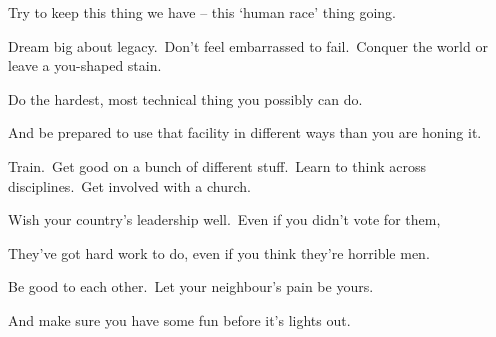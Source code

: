 Try to keep this thing we have -- this `human race' thing going.

Dream big about legacy.\ Don't feel embarrassed to fail.\ Conquer the world or leave a you-shaped stain.

Do the hardest, most technical thing you possibly can do.

And be prepared to use that facility in different ways than you are honing it.

Train.\ Get good on a bunch of different stuff.\ Learn to think across disciplines.\ Get involved with a church.

Wish your country's leadership well.\ Even if you didn't vote for them,

They've got hard work to do, even if you think they're horrible men.

Be good to each other.\ Let your neighbour's pain be yours.

And make sure you have some fun before it's lights out.


